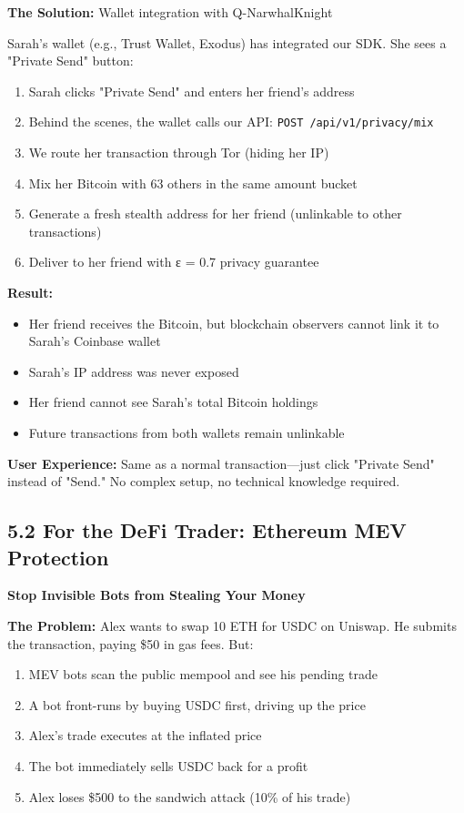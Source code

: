 \documentclass[11pt,a4paper]{article}
\begin{document}
\textbf{The Solution:} Wallet integration with Q-NarwhalKnight

Sarah's wallet (e.g., Trust Wallet, Exodus) has integrated our SDK. She sees a "Private Send" button:
\begin{enumerate}
    \item Sarah clicks "Private Send" and enters her friend's address
    \item Behind the scenes, the wallet calls our API: \texttt{POST /api/v1/privacy/mix}
    \item We route her transaction through Tor (hiding her IP)
    \item Mix her Bitcoin with 63 others in the same amount bucket
    \item Generate a fresh stealth address for her friend (unlinkable to other transactions)
    \item Deliver to her friend with ε = 0.7 privacy guarantee
\end{enumerate}

\textbf{Result:}
\begin{itemize}
    \item Her friend receives the Bitcoin, but blockchain observers cannot link it to Sarah's Coinbase wallet
    \item Sarah's IP address was never exposed
    \item Her friend cannot see Sarah's total Bitcoin holdings
    \item Future transactions from both wallets remain unlinkable
\end{itemize}

\textbf{User Experience:} Same as a normal transaction—just click "Private Send" instead of "Send." No complex setup, no technical knowledge required.

\subsection{5.2 For the DeFi Trader: Ethereum MEV Protection}

\textbf{Stop Invisible Bots from Stealing Your Money}

\textbf{The Problem:} Alex wants to swap 10 ETH for USDC on Uniswap. He submits the transaction, paying \$50 in gas fees. But:
\begin{enumerate}
    \item MEV bots scan the public mempool and see his pending trade
    \item A bot front-runs by buying USDC first, driving up the price
    \item Alex's trade executes at the inflated price
    \item The bot immediately sells USDC back for a profit
    \item Alex loses \$500 to the sandwich attack (10\% of his trade)
\end{enumerate}
\end{document}
